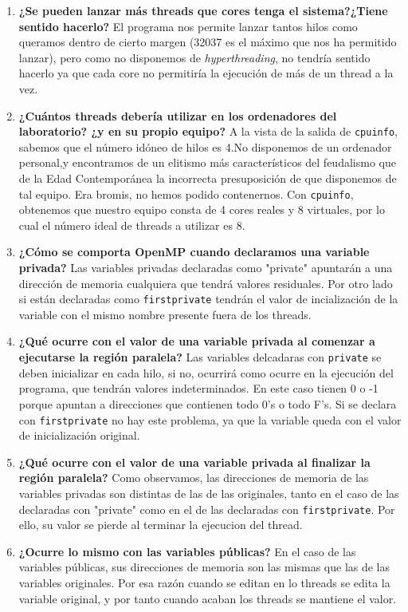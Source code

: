 \documentclass{report}
\newcommand\tab[1][0.6cm]{\hspace*{#1}}
\newcommand\nl{\newline\tab}
\begin{document}
	\begin{enumerate}
		\item{\textbf{ ¿Se
				pueden	lanzar	más	threads	que	cores	tenga	el	sistema?¿Tiene	sentido	hacerlo?}
			\nl El programa nos permite lanzar tantos hilos como queramos dentro de cierto margen (32037 es el máximo que nos ha permitido lanzar), pero como no disponemos de 
			\textit{hyperthreading}, no tendría sentido hacerlo ya 
			que cada core no permitiría la ejecución de más de un 
			thread a la vez.}
		\item{\textbf { \tab ¿Cuántos	threads	debería	utilizar	en	los	ordenadores	del	laboratorio?	¿y	en	su	propio	equipo?	} \nl 
			A la vista de la salida de \texttt{cpuinfo}, sabemos que el número idóneo de hilos es 4.\nl No disponemos de un ordenador personal,y encontramos de un elitismo más característicos del feudalismo que de la Edad Contemporánea la incorrecta presuposición de que disponemos de tal equipo.\nl
			Era bromis, no hemos podido contenernos. Con \texttt{cpuinfo}, obtenemos que nuestro equipo consta de 4 cores reales y 8 virtuales, por lo cual el número ideal de threads a utilizar es 8. }
		\item{\textbf {\tab ¿Cómo se comporta OpenMP	cuando	declaramos	una	variable	privada?		} \nl Las variables privadas declaradas como "private" apuntarán a una dirección de memoria cualquiera que tendrá valores residuales. Por otro lado si están declaradas como \texttt{firstprivate} tendrán el valor de incialización de la variable con el mismo nombre presente fuera de los threads. }
		\item{\textbf {\tab ¿Qué ocurre	con	el valor de una variable privada al comenzar a	ejecutarse	la región paralela? } \nl Las variables delcadaras con \texttt{private} se deben inicializar en cada hilo, si no, ocurrirá como ocurre en la ejecución del programa, que tendrán valores indeterminados. En este caso tienen 0 o -1 porque apuntan a direcciones que contienen todo 0's o todo F's. Si se declara con \texttt{firstprivate} no hay este problema, ya que la variable queda con el valor de inicialización original.}
		\item{\textbf {\tab ¿Qué	ocurre	con	el	valor	de	una	variable	privada	al	finalizar	la	región	paralela?		} \nl Como observamos, las direcciones de memoria de las variables privadas son distintas de las de las originales, tanto en el caso de las declaradas con "private" como en el de las declaradas con \texttt{firstprivate}. Por ello, su valor se pierde al terminar la ejecucion del thread.}
		\item{\textbf {\tab ¿Ocurre	lo	mismo	con	las	variables	públicas?		} \nl 
			En el caso de las variables públicas, sus direcciones de memoria son las mismas que las de las variables originales. Por esa razón cuando se editan en lo threads se edita la variable original, y por tanto cuando acaban los threads se mantiene el valor.}
		
	\end{enumerate}
	
\end{document}
